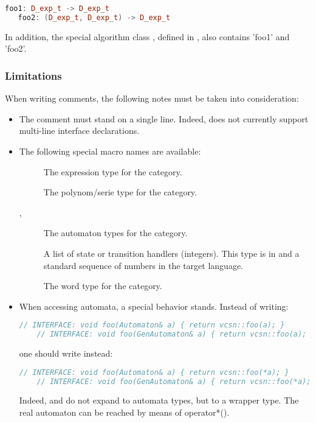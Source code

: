 \begin{lstlisting}[language=C++]
   foo1: D_exp_t -> D_exp_t
   foo2: (D_exp_t, D_exp_t) -> D_exp_t
\end{lstlisting}

In   addition,  the   special  algorithm   class  ,   defined  in
, also contains 'foo1' and 'foo2'.

\subsubsection{Limitations}

When writing   comments, the following  notes must be
taken into consideration:

\begin{itemize}
\item The comment must stand on a single line.  Indeed,
   does not currently support multi-line interface
  declarations.

\item The following special macro names are available:

  \begin{description}
  \item[] The expression type for the category.
  \item[] The polynom/serie type for the category.
  \item[, ] The automaton types for
    the category.
  \item[] A list of state or transition handlers
    (integers). This type is  in \Cxx and a
    standard sequence of numbers in the target language.
  \item[] The word type for the category.
  \end{description}

\item When accessing automata, a special behavior stands. Instead of
  writing:

  \begin{lstlisting}[language=C++]
    // INTERFACE: void foo(Automaton& a) { return vcsn::foo(a); }
    // INTERFACE: void foo(GenAutomaton& a) { return vcsn::foo(a); }
  \end{lstlisting}

  one should write instead:

  \begin{lstlisting}[language=C++]
    // INTERFACE: void foo(Automaton& a) { return vcsn::foo(*a); }
    // INTERFACE: void foo(GenAutomaton& a) { return vcsn::foo(*a); }
  \end{lstlisting}

  Indeed,     and    do   not  expand  to
  \Vauc automata types, but to  a wrapper type. The real automaton
  can be reached by means of operator*().

\end{itemize}

